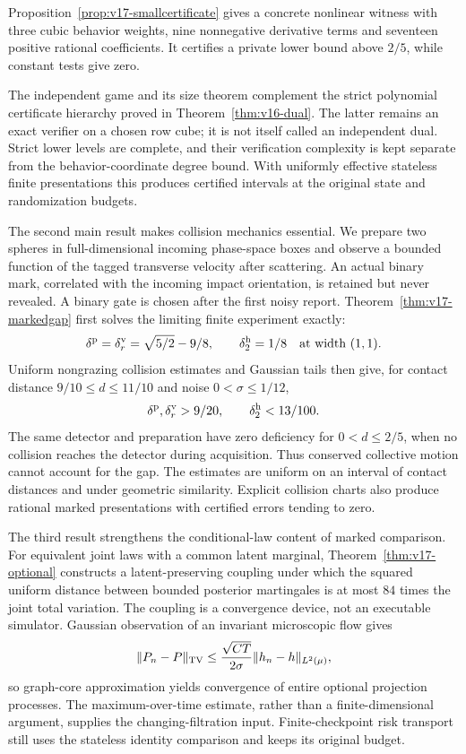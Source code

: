 Proposition~\ref{prop:v17-smallcertificate} gives a concrete nonlinear
witness with three cubic behavior weights, nine nonnegative derivative
terms and seventeen positive rational coefficients. It certifies a
private lower bound above $2/5$, while constant tests give zero.

The independent game and its size theorem complement the strict
polynomial certificate hierarchy proved in
Theorem~\ref{thm:v16-dual}. The latter remains an exact verifier on a
chosen row cube; it is not itself called an independent dual. Strict
lower levels are complete, and their verification complexity is kept
separate from the behavior-coordinate degree bound. With uniformly
effective stateless finite presentations this produces certified
intervals at the original state and randomization budgets.

The second main result makes collision mechanics essential. We prepare
two spheres in full-dimensional incoming phase-space boxes and observe
a bounded function of the tagged transverse velocity after scattering.
An actual binary mark, correlated with the incoming impact orientation,
is retained but never revealed. A binary gate is chosen after the
first noisy report. Theorem~\ref{thm:v17-markedgap} first solves the
limiting finite experiment exactly:
\[
 \delta^{\rm p}=\delta^{\rm v}_r=\sqrt{5/2}-9/8,\qquad \delta^{\rm h}_2=1/8
 \quad\hbox{at width }(1,1).
\]
Uniform nongrazing collision estimates and Gaussian tails then give,
for contact distance $9/10\le d\le11/10$ and noise
$0<\sigma\le1/12$,
\[
 \delta^{\rm p},\delta^{\rm v}_r>9/20,\qquad \delta^{\rm h}_2<13/100.
\]
The same detector and preparation have zero deficiency for
$0<d\le2/5$, when no collision reaches the detector during acquisition.
Thus conserved collective motion cannot account for the gap. The
estimates are uniform on an interval of contact distances and under
geometric similarity. Explicit collision charts also produce rational
marked presentations with certified errors tending to zero.

The third result strengthens the conditional-law content of marked
comparison. For equivalent joint laws with a common latent marginal,
Theorem~\ref{thm:v17-optional} constructs a latent-preserving coupling
under which the squared uniform distance between bounded posterior
martingales is at most $84$ times the joint total variation. The
coupling is a convergence device, not an executable simulator.
Gaussian observation of an invariant microscopic flow gives
\[
 \|P_n-P\|_{\rm TV}\le\frac{\sqrt{CT}}{2\sigma}
                  \|h_n-h\|_{L^2(\mu)},
\]
so graph-core approximation yields convergence of entire optional
projection processes. The maximum-over-time estimate, rather than a
finite-dimensional argument, supplies the changing-filtration input.
Finite-checkpoint risk transport still uses the stateless identity
comparison and keeps its original budget.

